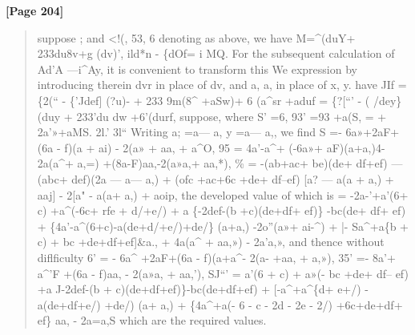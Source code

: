 \documentclass[11pt,a4paper]{book}
\begin{document}
\textbf{[Page 204]}\\[0.2cm]
\begin{quote}
suppose ; and <!(, 53, 6 denoting as above, we have
M=\textasciicircum{}(duY+ 233du8v+g (dv)', ild*n - \{dOf= i MQ.
For the subsequent calculation of Ad'A ---i\textasciicircum{}Ay, it is convenient to transform this
We
expression by introducing therein dvr in place of dv, and a, a, in place of x, y.
have
JIf = \{2(`` - \{'Jdef] (?u)- + 233 9m(8\textasciicircum{} +aSw)+ 6 (a\textasciicircum{}sr +aduf
= \{?[``' - ( /dey\} (duy + 233'du dw +6'(durf,
suppose, where
S' =6,
93' =93 +a(S,
= + 2a'»+aMS.
2l.' 3l``
Writing
a;
=a---
a, y
=a---
a,,
we find
S =- 6a»+2aF+(6a - f)(a + ai) - 2(a» + aa, + a\textasciicircum{}O,
95
= 4a'-a\textasciicircum{}+ (-6a»+ aF)(a+a,)4-2a(a\textasciicircum{}+
a,=)
+(8a-F)aa,-2(a»a,+
aa,*),
\% = -(ab+ac+ be)(de+ df+ef)
--- (abc+ def)(2a --- a--- a,)
+ (ofc +ac+6c +de+ df--ef) [a? --- a(a + a,) + aaj]
- 2[a" - a(a+ a,) + aoip,
the developed value of which is
= -2a-'+a'(6+ c) +a\textasciicircum{}(-6c+ rfe + d/+e/)
+ a \{-2def-(b +c)(de+df+ ef)\} -bc(de+ df+ ef)
+ \{4a'-a\textasciicircum{}(6+c)-a(de+d/+e/)+de/\} (a+a,)
-2o''(a»+ ai-\textasciicircum{}) + |- Sa\textasciicircum{}+a\{b + c) + bc +de+df+ef]\&a.,
+ 4a(a\textasciicircum{} +
aa,»)
-
2a'a,»,
and thence without diflficulty
6' = - 6a\textasciicircum{} +2aF+(6a - f)(a+a\textasciicircum{}- 2(a- +aa, + a,»),
35' =- 8a'+ a\textasciicircum{}'F +(6a - f)aa, - 2(a»a, + aa,'),
SJ``' = a'(6 + c) + a»(- bc +de+ df-- ef) +a J-2def-(b + c)(de+df+ef)\}-bc(de+df+ef)
+ [-a\textasciicircum{}+a\textasciicircum{}\{d+ e+/) -a(de+df+e/) +de/) (a+ a,)
+ \{4a\textasciicircum{}+a(- 6 - c - 2d - 2e - 2/) +6c+de+df+ ef\} aa,
-
2a=a,S
which are the required values.
\end{quote}
\end{document}
